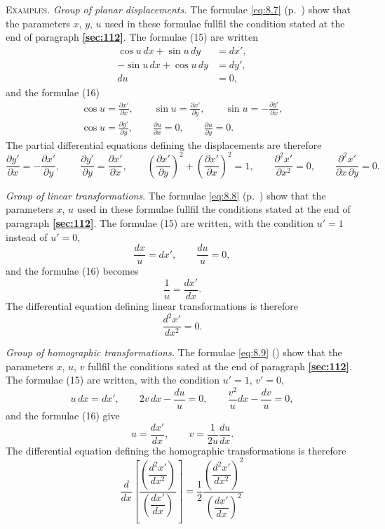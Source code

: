 \documentclass[leqno,11pt]{book}
\numberwithin{equation}{chapter}
\newcommand{\pd}{\partial}
\theoremstyle{shape1}
\theoremstyle{shapesmall}
\newcommand{\fsref}[1]{{\rm\textsection\textbf{\ref{sec:#1}}}}
\newcommand{\somespace}{\vspace{9pt}}
\begin{document}
{\small

\textsc{Examples.} \emph{Group of planar displacements.} The formulae \eqref{eq:8.7} (p.~\pageref{eq:8.7}) show that the parameters $x$, $y$, $u$ used in these formulae fullfil the condition stated at the end of paragraph \fsref{112}. The formulae (15) are written
\begin{align*}
  \cos u\,dx+\sin u\,dy&=dx',\\
  -\sin u\,dx+\cos u\,dy&=dy',\\
  du&=0,
\end{align*}
and the formulae (16)
\begin{gather*}
  \cos u=\frac{\pd x'}{\pd x},\qquad\sin u=\frac{\pd x'}{\pd y},\qquad \sin u=-\frac{\pd y'}{\pd x},\\
  \cos u=\frac{\pd y'}{\pd y},\qquad\frac{\pd u}{\pd x}=0,\qquad\frac{\pd u}{\pd y}=0.
\end{gather*}
The partial differential equations defining the displacements are therefore
\[
\frac{\pd y'}{\pd x}=-\frac{\pd x'}{\pd y},\qquad\frac{\pd y'}{\pd y}=\frac{\pd x'}{\pd x},\qquad\left(\frac{\pd x'}{\pd y}\right)^{2}+\left(\frac{\pd x'}{\pd x}\right)^{2}=1,\qquad\frac{\pd ^{2}x'}{\pd x^{2}}=0,\qquad\frac{\pd^{2}x'}{\pd x\,\pd y}=0.
\]

\somespace

\emph{Group of linear transformations}. The formulae \eqref{eq:8.8} (p.~\pageref{eq:8.8}) show that the parameters $x$, $u$ used in these formulae fullfil the conditions stated at the end of paragraph \fsref{112}. The formulae (15) are written, with the condition $u'=1$ instead of $u'=0$,
\[
\frac{dx}{u}=dx',\qquad\frac{du}{u}=0,
\]
and the formulae (16) becomes
\[
\frac{1}{u}=\frac{dx'}{dx}.
\]
The differential equation defining linear transformations is therefore
\[
\frac{d^{2}x'}{dx^{2}}=0.
\]

\somespace

\emph{Group of homographic transformations.} The formulae \eqref{eq:8.9} (\pageref{eq:8.9}) show that the parameters $x$, $u$, $v$ fullfil the conditions sated at the end of paragraph \fsref{112}. The formulae (15) are written, with the condition $u'=1$, $v'=0$,
\[
u\,dx=dx',\qquad 2v\,dx-\frac{du}{u}=0,\qquad\frac{v^{2}}{u}dx-\frac{dv}{u}=0,
\]
and the formulae (16) give
\[
u=\frac{dx'}{dx},\qquad v=\frac{1}{2u}\frac{du}{dx}.
\]
The differential equation defining the homographic transformations is therefore
\[
\frac{d}{dx}\left[\frac{\left(\dfrac{d^{2}x'}{dx^{2}}\right)}{\left(\dfrac{dx'}{dx}\right)}\right]=\frac{1}{2}\frac{\left(\dfrac{d^{2}x'}{dx^{2}}\right)^{2}}{\left(\dfrac{dx'}{dx}\right)^{2}}
\]
}
\end{document}
